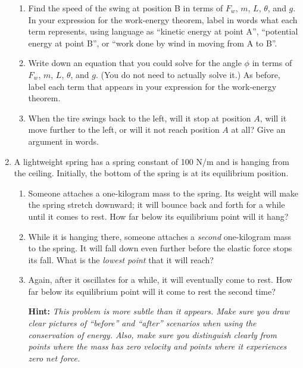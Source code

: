 \documentclass[12pt]{article}
\begin{document}
\begin{enumerate}
	
	

	
	
	\begin{enumerate}
		\item Find the speed of the swing at position B in terms of $F_w$, $m$, $L$, $\theta$, and $g$. In your expression for the work-energy theorem, label in words what each term represents, using language as ``kinetic energy at point A'', ``potential energy at point B'', or ``work done by wind in moving from A to B''.
		\item Write down an equation that you could solve for the angle $\phi$ in terms of $F_w$, $m$, $L$, $\theta$, and $g$. (You do not need to actually solve it.) As before, label each term that appears in your expression for the work-energy theorem.
		
		\item When the tire swings back to the left, will it stop at position $A$, will it move further to the left, or will it not reach position $A$ at all? Give an argument in words.
	\end{enumerate} 
	
	
	\vspace{0.5in}


\item A lightweight spring has a spring constant of 100 N/m and is hanging from the ceiling. Initially, the bottom of the spring is at its equilibrium position.

\begin{enumerate}
\item Someone attaches a one-kilogram mass to the spring. Its weight will make the spring stretch downward; it will bounce back and forth for a while until it comes to rest. How far below its equilibrium point will it hang?

\item While it is hanging there, someone attaches a {\it second} one-kilogram mass to the spring. It will fall down even further before the elastic force stops its fall. What is the {\it lowest point} that it will reach?

\item Again, after it oscillates for a while, it will eventually come to rest. How far below its equilibrium point will it come to rest the second time?

{\bf Hint: } {\it This problem is more subtle than it appears. Make sure you draw clear pictures of ``before'' and ``after'' scenarios when using the conservation of energy. Also, make sure you distinguish clearly from points where the mass has {\rm zero velocity} and points where it experiences {\rm zero net force}.}






\end{enumerate}
\end{enumerate}
\end{document}
